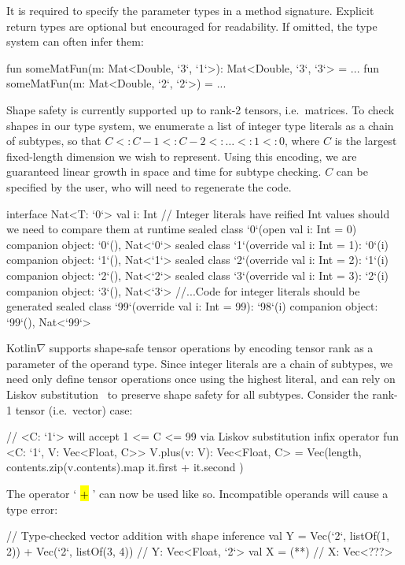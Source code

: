 \documentclass[12pt,initial,twoside,maitrise]{dms}
\makeatletter
\def\uwave{\bgroup \markoverwith{\lower3.5\p@\hbox{\sixly \textcolor{red}{\char58}}}\ULon}
\newcommand{\inline}[1]{%
    \begingroup%
    \sethlcolor{slightgray}%
    \hl{\ttfamily\small #1}%
    \endgroup
}
\numberwithin{equation}{section}
\numberwithin{table}{chapter}
\numberwithin{figure}{chapter}
\makeatother
\begin{document}
%
It is required to specify the parameter types in a method signature. Explicit return types are optional but encouraged for readability. If omitted, the type system can often infer them:
%
\begin{kotlinlisting}
fun someMatFun(m: Mat<Double, `3`, `1`>): Mat<Double, `3`, `3`> = ...
fun someMatFun(m: Mat<Double, `2`, `2`>) = ...
\end{kotlinlisting}
%
Shape safety is currently supported up to rank-2 tensors, i.e.\ matrices. To check shapes in our type system, we enumerate a list of integer type literals as a chain of subtypes, so that $C <: C - 1 <: C - 2 <: \dots <: 1 <: 0$, where $C$ is the largest fixed-length dimension we wish to represent. Using this encoding, we are guaranteed linear growth in space and time for subtype checking. $C$ can be specified by the user, who will need to regenerate the code.
%
\begin{kotlinlisting}[caption={Shape safe tensor addition for rank-1 tensors, $\forall C\leq2.$}]
interface Nat<T: `0`> { val i: Int }
// Integer literals have reified Int values should we need to compare them at runtime
sealed class `0`(open val i: Int = 0) { companion object: `0`(), Nat<`0`> }
sealed class `1`(override val i: Int = 1): `0`(i) { companion object: `1`(), Nat<`1`> }
sealed class `2`(override val i: Int = 2): `1`(i) { companion object: `2`(), Nat<`2`> }
sealed class `3`(override val i: Int = 3): `2`(i) { companion object: `3`(), Nat<`3`> }
//...Code for integer literals should be generated
sealed class `99`(override val i: Int = 99): `98`(i) { companion object: `99`(), Nat<`99`> }
\end{kotlinlisting}
%
Kotlin$\nabla$ supports shape-safe tensor operations by encoding tensor rank as a parameter of the operand type. Since integer literals are a chain of subtypes, we need only define tensor operations once using the highest literal, and can rely on Liskov substitution~\citep{liskov1987} to preserve shape safety for all subtypes. Consider the rank-1 tensor (i.e.\ vector) case:
%
\begin{kotlinlisting}
// <C: `1`> will accept 1 <= C <= 99 via Liskov substitution
infix operator fun <C: `1`, V: Vec<Float, C>> V.plus(v: V): Vec<Float, C> =
    Vec(length, contents.zip(v.contents).map { it.first + it.second })
\end{kotlinlisting}
%
The operator `\inline{+}' can now be used like so. Incompatible operands will cause a type error:
%
\begin{kotlinlisting}
// Type-checked vector addition with shape inference
val Y = Vec(`2`, listOf(1, 2)) + Vec(`2`, listOf(3, 4)) // Y: Vec<Float, `2`>
val X = (*\uwave{Vec(`2`, listOf(1, 2)) + Vec(`5`, listOf(3, 4, 1, 2, 4))}*) // X: Vec<???>
\end{kotlinlisting}
\end{document}
